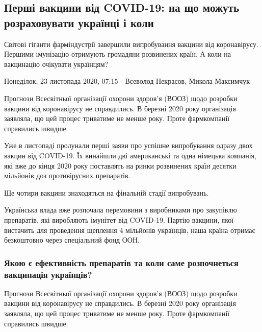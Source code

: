  
 
 

\subsection{Перші вакцини від COVID-19: на що можуть розраховувати українці і коли}


Світові гіганти фарміндустрії завершили випробування вакцини від коронавірусу.
Першими імунізацію отримують громадяни розвинених країн. А коли на вакцинацію
очікувати українцям?

Понеділок, 23 листопада 2020, 07:15 - Всеволод Некрасов, Микола Максимчук

Прогнози Всесвітньої організації охорони здоров'я (ВООЗ) щодо розробки вакцини
від коронавірусу не справдились. В березні 2020 року організація заявляла, що
цей процес триватиме не менше року. Проте фармкомпанії справились швидше.

Уже в листопаді пролунали перші заяви про успішне випробування одразу двох
вакцин від COVID-19. Їх винайшли дві американські та одна німецька компанія,
які вже до кінця 2020 року поставлять на ринки розвинених країн десятки
мільйонів доз противірусних препаратів.

Ще чотири вакцини знаходяться на фінальній стадії випробувань.

Українська влада вже розпочала перемовини з виробниками про закупівлю
препаратів, які виробляють імунітет від COVID-19. Партію вакцини, якої
вистачить для проведення щеплення 4 мільйонів українців, наша країна отримає
безкоштовно через спеціальний фонд ООН.

\subsubsection{Якою є ефективність препаратів та коли саме розпочнеться вакцинація українців?}

Прогнози Всесвітньої організації охорони здоров'я (ВООЗ) щодо розробки вакцини
від коронавірусу не справдились. В березні 2020 року організація заявляла, що
цей процес триватиме не менше року. Проте фармкомпанії справились швидше.

